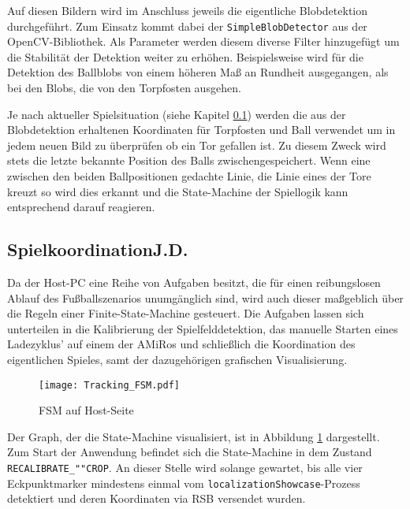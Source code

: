 Auf diesen Bildern wird im Anschluss jeweils die eigentliche Blobdetektion durchgeführt. Zum Einsatz kommt dabei der \texttt{SimpleBlobDetector} aus der OpenCV-Bibliothek. Als Parameter werden diesem diverse Filter hinzugefügt um die Stabilität der Detektion weiter zu erhöhen. Beispielsweise wird für die Detektion des Ballblobs von einem höheren Maß an Rundheit ausgegangen, als bei den Blobs, die von den Torpfosten ausgehen.

Je nach aktueller Spielsituation (siehe Kapitel \ref{kap:spielkoordination}) werden die aus der Blobdetektion erhaltenen Koordinaten für Torpfosten und Ball verwendet um in jedem neuen Bild zu überprüfen ob ein Tor gefallen ist. Zu diesem Zweck wird stets die letzte bekannte Position des Balls zwischengespeichert. Wenn eine zwischen den beiden Ballpositionen gedachte Linie, die Linie eines der Tore kreuzt so wird dies erkannt und die State-Machine der Spiellogik kann entsprechend darauf reagieren.

\subsection[Spielkoordination]{Spielkoordination\hfill {\normalsize J.D.}} \label{kap:spielkoordination}%

Da der Host-PC eine Reihe von Aufgaben besitzt, die für einen reibungslosen Ablauf des Fußballszenarios unumgänglich sind, wird auch dieser maßgeblich über die Regeln einer Finite-State-Machine gesteuert. Die Aufgaben lassen sich unterteilen in die Kalibrierung der Spielfelddetektion, das manuelle Starten eines Ladezyklus' auf einem der AMiRos und schließlich die Koordination des eigentlichen Spieles, samt der dazugehörigen grafischen Visualisierung. 

\begin{figure}[h]
	\begin{center}
		\texttt{[image: Tracking\_FSM.pdf]} 	
		\caption{FSM auf Host-Seite}
		\label{fig:fsm-host}
	\end{center}
\end{figure}

Der Graph, der die State-Machine visualisiert, ist in Abbildung \ref{fig:fsm-host} dargestellt. Zum Start der Anwendung befindet sich die State-Machine in dem Zustand \texttt{RECALIBRATE\_""CROP}. An dieser Stelle wird solange gewartet, bis alle vier Eckpunktmarker mindestens einmal vom \texttt{localizationShowcase}-Prozess detektiert und deren Koordinaten via RSB versendet wurden.

